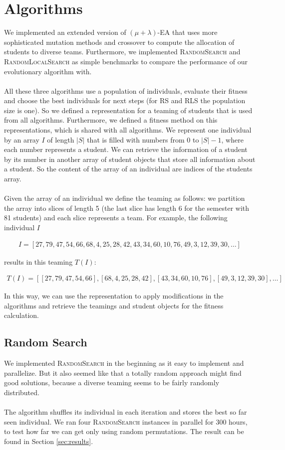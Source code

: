 \documentclass[12pt,a4paper]{article}
\begin{document}
\section{Algorithms}
\label{sec:algorithms}
We implemented an extended version of $(\mu + \lambda)$-EA that uses more sophisticated mutation methods and crossover to compute the allocation of students to diverse teams. Furthermore, we implemented \textsc{RandomSearch} and \textsc{RandomLocalSearch} as simple benchmarks to compare the performance of our evolutionary algorithm with.\\
\\
All these three algorithms use a population of individuals, evaluate their fitness and choose the best individuals for next steps (for RS and RLS the population size is one). So we defined a representation for a teaming of students that is used from all algorithms. Furthermore, we defined a fitness method on this representations, which is shared with all algorithms. We represent one individual by an array $I$ of length $|S|$ that is filled with numbers from $0$ to $|S| - 1$, where each number represents a student. We can retrieve the information of a student by its number in another array of student objects that store all information about a student. So the content of the array of an individual are indices of the students array.\\
\\
Given the array of an individual we define the teaming as follows: we partition the array into slices of length 5 (the last slice has length 6 for the semester with 81 students) and each slice represents a team. For example, the following individual $I$

\begin{align*}
    I = [27,79,47,54,66,68,4,25,28,42,43,34,60,10,76,49,3,12,39,30,\dots]
\end{align*}

results in this teaming $T(I)$:

\begin{align*}
    T(I) = [[27,79,47,54,66],[68,4,25,28,42],[43,34,60,10,76],[49,3,12,39,30],\dots]
\end{align*}

In this way, we can use the representation to apply modifications in the algorithms and retrieve the teamings and student objects for the fitness calculation.

\subsection{Random Search}
\label{sec:random-search}
We implemented \textsc{RandomSearch} in the beginning as it easy to implement and parallelize. But it also seemed like that a totally random approach might find good solutions, because a diverse teaming seems to be fairly randomly distributed.\\
\\
The algorithm shuffles its individual in each iteration and stores the best so far seen individual. We ran four \textsc{RandomSearch} instances in parallel for 300 hours, to test how far we can get only using random permutations. The result can be found in Section \ref{sec:results}.
\end{document}

